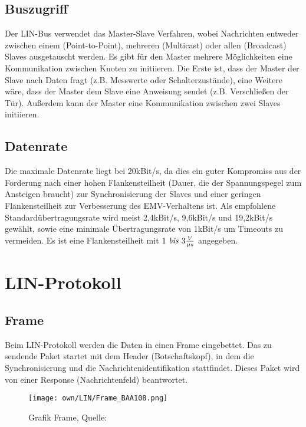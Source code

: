     \subsection{Buszugriff}
    Der LIN-Bus verwendet das Master-Slave Verfahren, wobei Nachrichten entweder zwischen einem (Point-to-Point), mehreren (Multicast) oder allen (Broadcast) Slaves ausgetauscht werden.
    Es gibt für den Master mehrere Möglichkeiten eine Kommunikation zwischen Knoten zu initiieren.
    Die Erste ist, dass der Master der Slave nach Daten fragt (z.B. Messwerte oder Schalterzustände), eine Weitere wäre, dass der Master dem Slave eine Anweisung sendet (z.B. Verschließen der Tür).
    Außerdem kann der Master eine Kommunikation zwischen zwei Slaves initiieren. 

    \subsection{Datenrate}
    Die maximale Datenrate liegt bei 20kBit/s, da dies ein guter Kompromiss aus der Forderung nach einer hohen Flankensteilheit (Dauer, die der Spannungspegel zum Ansteigen braucht) zur Synchronisierung der Slaves und einer geringen Flankensteilheit zur Verbesserung des \ac{EMV}-Verhaltens ist.
    Als empfohlene Standardübertragungsrate wird meist 2,4kBit/s, 9,6kBit/s und 19,2kBit/s gewählt, sowie eine minimale Übertragungsrate von 1kBit/s um Timeouts zu vermeiden.
    Es ist eine Flankensteilheit mit $1 \text{ \it{bis} } 3 \frac{V}{\mu s}$ angegeben.


\section{LIN-Protokoll}
    \subsection{Frame}
    Beim \ac{LIN}-Protokoll werden die Daten in einen Frame eingebettet.
    Das zu sendende Paket startet mit dem Header (Botschaftskopf), in dem die Synchronisierung und die Nachrichtenidentifikation stattfindet.
    Dieses Paket wird von einer Response (Nachrichtenfeld) beantwortet. 
    \begin{figure}[!htbp]
        \centering
        \texttt{[image: own/LIN/Frame\_BAA108.png]}
        \caption{Grafik Frame, Quelle: \cite{BAA2011, S.108}}
        \label{fig:FrameLIN}
    \end{figure}

